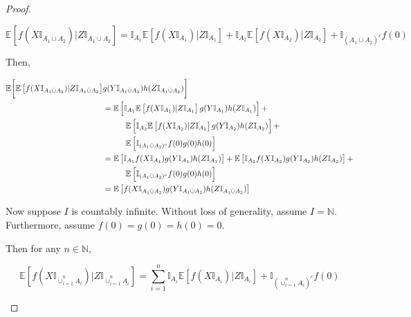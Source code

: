 \documentclass[12pt]{article}
\newcommand{\mb}{\mathbb}
\newcommand{\ex}[1]{\mb{E}\left[#1\right]}			%
\newcommand{\Xf}{X}									%
\newcommand{\Xg}{Y}									%
\newcommand{\Xh}{Z}									%
\renewcommand{\it}[1]{_{#1}}						%
\newcommand{\typset}{A}							%
\begin{document}
\begin{proof}
\begin{enumerate}[(a)]
\begin{equation}
\ex{f(\Xf\mb{I}_{\typset\it{1}\dot{\cup} \typset\it{2}})|\Xh\mb{I}_{\typset\it{1}\dot{\cup} \typset\it{2}}} = \mb{I}_{\typset\it{1}}\ex{f(\Xf\mb{I}_{\typset\it{1}})|\Xh\mb{I}_{\typset\it{1}}} + \mb{I}_{\typset\it{2}}\ex{f(\Xf\mb{I}_{\typset\it{2}})|\Xh\mb{I}_{\typset\it{2}}} + \mb{I}_{(\typset\it{1}\dot{\cup} \typset\it{2})^c}f(0)
\label{TL::disjoint sum CE}
\end{equation}

Then,

\begin{align*}
\mb{E}\bigg[\ex{f(\Xf\mb{I}_{\typset\it{1}\dot{\cup} \typset\it{2}})|\Xh\mb{I}_{\typset\it{1}\dot{\cup} \typset\it{2}}}&g(\Xg\mb{I}_{\typset\it{1}\dot{\cup} \typset\it{2}})h(\Xh\mb{I}_{\typset\it{1}\dot{\cup} \typset\it{2}})\bigg]\\
&= \ex{\mb{I}_{\typset\it{1}}\ex{f(\Xf\mb{I}_{\typset\it{1}})|\Xh\mb{I}_{\typset\it{1}}}g(\Xg\mb{I}_{\typset\it{1}})h(\Xh\mb{I}_{\typset\it{1}})} +\\
&\hspace{1 cm} \ex{\mb{I}_{\typset\it{2}}\ex{f(\Xf\mb{I}_{\typset\it{2}})|\Xh\mb{I}_{\typset\it{2}}}g(\Xg\mb{I}_{\typset\it{2}})h(\Xh\mb{I}_{\typset\it{2}})} + \\
&\hspace{1 cm} \ex{\mb{I}_{(\typset\it{1}\dot{\cup} \typset\it{2})^c}f(0)g(0)h(0)}\\
&= \ex{\mb{I}_{\typset\it{1}}f(\Xf\mb{I}_{\typset\it{1}})g(\Xg\mb{I}_{\typset\it{1}})h(\Xh\mb{I}_{\typset\it{1}})} + \ex{\mb{I}_{\typset\it{2}}f(\Xf\mb{I}_{\typset\it{2}})g(\Xg\mb{I}_{\typset\it{2}})h(\Xh\mb{I}_{\typset\it{2}})} +\\
&\hspace{1 cm} \ex{\mb{I}_{(\typset\it{1}\dot{\cup} \typset\it{2})^c}f(0)g(0)h(0)}\\
&= \ex{f(\Xf\mb{I}_{\typset\it{1}\dot{\cup} \typset\it{2}})g(\Xg\mb{I}_{\typset\it{1}\dot{\cup} \typset\it{2}})h(\Xh\mb{I}_{\typset\it{1}\dot{\cup} \typset\it{2}})}
\end{align*}

Now suppose \(I\) is countably infinite. Without loss of generality, assume \(I = \mb{N}\). Furthermore, assume \(f(0) = g(0) = h(0) = 0\).

Then for any \(n \in \mb{N}\),

\[\ex{f(\Xf\mb{I}_{\dot{\cup}_{i=1}^n \typset\it{i}})|\Xh\mb{I}_{\dot{\cup}_{i=1}^n \typset\it{i}}} = \sum_{i=1}^n \mb{I}_{\typset\it{i}}\ex{f(\Xf\mb{I}_{\typset\it{i}})|\Xh\mb{I}_{\typset\it{i}}} + \mb{I}_{\left(\dot{\cup}_{i=1}^n \typset\it{i}\right)^c} f(0)\]


\end{enumerate}
\end{proof}
\end{document}
